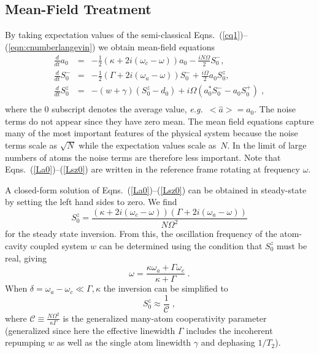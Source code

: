 \documentclass[aps,
twocolumn,
showpacs,
superscriptaddress,groupedaddress]{revtex4}
\begin{document}
\subsection{Mean-Field Treatment}
\label{MFE}

By taking expectation values of the semi-classical
Eqns.~(\ref{cq1})--(\ref{eqn:cnumberlangevin}) we obtain mean-field
equations
\begin{eqnarray}
\frac{d}{dt} a_0&=& -\frac{1}{2} (\kappa +2i(\omega_c-\omega)) a_0
-\frac{i N \Omega}{2} S_0^{-},
\label{La0}\\
\frac{d}{dt} S_0^{-} &=&
-\frac{1}{2} \left(\Gamma +2 i (\omega_a-\omega) \right)  S_0^{-}
+\frac{i \Omega}{2} a_0 S_0^{z},\\
\frac{d}{dt} S_0^{z} &=& -(w+\gamma)\left( S_0^{z} - d_0\right)
+i\Omega \left( a_0^{*} S_0^{-} - a_0 S_0^{+} \right)\;,\nonumber\\
\label{Lsz0}
\end{eqnarray}
where the $0$ subscript denotes the average value, {\em e.g.}\
$\bigl< \hat{a} \bigr>=a_0$. The noise terms do not appear since they
have zero mean.  The mean field equations capture many of the most
important features of the physical system because the noise terms
scale as $\sqrt{N}$ while the expectation values scale as~$N$.  In the
limit of large numbers of atoms the noise terms are therefore less
important.  Note that Eqns.~(\ref{La0})--(\ref{Lsz0}) are written in
the reference frame rotating at frequency $\omega$.

A closed-form solution of Eqns.~(\ref{La0})--(\ref{Lsz0}) can be
obtained in steady-state by setting the left hand sides to zero.  We
find
\begin{equation}
S_0^{z}=
\frac{(\kappa+2i(\omega_c-\omega))(\Gamma+2i(\omega_a-\omega))}{N\Omega^2}
\label{Sz01}
\end{equation}
for the steady state inversion. From this, the oscillation frequency
of the atom-cavity coupled system $w$ can be determined using the
condition that $S_0^{z}$ must be real, giving
\begin{equation}
\omega = \frac{\kappa \omega_a + \Gamma \omega_c}{\kappa+\Gamma}\;.
\label{atomcavityfrequencycenter1}
\end{equation}
When $\delta = \omega_a-\omega_c \ll \Gamma,\kappa$ the inversion can be
simplified to
\begin{equation}
S_0^{z}\approx \frac{1}{\mathcal{C}}\;,
\end{equation}
where $\mathcal{C}\equiv \frac{N \Omega^2}{\kappa \Gamma}$ is the
generalized many-atom cooperativity parameter (generalized since here
the effective linewidth $\Gamma$ includes the incoherent repumping $w$
as well as the single atom linewidth $\gamma$ and dephasing $1/T_2$).
\end{document}
